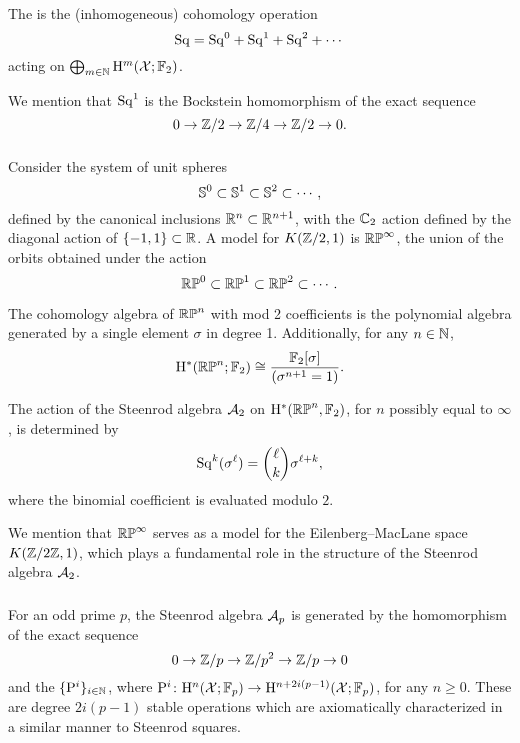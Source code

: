 The  is the (inhomogeneous) cohomology operation
\[
\mathrm{Sq} = \mathrm{Sq}^0 + \mathrm{Sq}^1 + \mathrm{Sq}^2 + \dotsb
\]
acting on \(\bigoplus_{m \in \mathbb{N}} \mathrm{H}^m(\mathcal{X}; {\mathbb{F}_2})\).

We mention that $\mathrm{Sq}^1$ is the Bockstein homomorphism of the exact sequence
\[
0 \to \mathbb{Z}/2 \to \mathbb{Z}/4 \to \mathbb{Z}/2 \to 0.
\]

\subsubsection{}\label{sss:cohomology_rpn}

Consider the system of unit spheres
\[
\mathbb{S}^0 \subset \mathbb{S}^1 \subset \mathbb{S}^2 \subset \dotsb,
\]
defined by the canonical inclusions \(\mathbb{R}^n \subset \mathbb{R}^{n+1}\), with the \(\mathbb{C}_2\) action defined by the diagonal action of \(\{-1,1\} \subset \mathbb{R}\).
A model for \(K(\mathbb{Z}/2, 1)\) is \(\mathbb{RP}^\infty\), the union of the orbits obtained under the action
\[
\mathbb{RP}^0 \subset \mathbb{RP}^1 \subset \mathbb{RP}^2 \subset \dotsb.
\]

The cohomology algebra of $\mathbb{RP}^n$ with mod 2 coefficients is the polynomial algebra generated by a single element $\sigma$ in degree 1.
Additionally, for any $n \in \mathbb{N}$,
\[
\mathrm{H}^\ast(\mathbb{RP}^n; {\mathbb{F}_2}) \cong \frac{{\mathbb{F}_2}[\sigma]}{(\sigma^{n+1} = 1)}.
\]

The action of the Steenrod algebra $\mathcal{A}_2$ on $\mathrm{H}^*(\mathbb{RP}^n, {\mathbb{F}_2})$, for $n$ possibly equal to $\infty$, is determined by
\[
\mathrm{Sq}^k(\sigma^\ell) = \binom{\ell}{k}\sigma^{\ell+k},
\]
where the binomial coefficient is evaluated modulo \(2\).

We mention that $\mathbb{RP}^\infty$ serves as a model for the Eilenberg--MacLane space $K(\mathbb{Z}/2\mathbb{Z}, 1)$, which plays a fundamental role in the structure of the Steenrod algebra \(\mathcal{A}_2\).

\subsubsection{}\label{sss:steenrod_odd}

For an odd prime \(p\), the Steenrod algebra $\mathcal{A}_p$ is generated by the  homomorphism of the exact sequence
\[
0 \to \mathbb{Z}/p \to \mathbb{Z}/p^2 \to \mathbb{Z}/p \to 0
\]
and the  \(\{\mathrm{P}^i\}_{i \in \mathbb{N}}\), where $\mathrm{P}^i \colon \mathrm{H}^n(\mathcal{X}; {\mathbb{F}_p}) \to \mathrm{H}^{n+2i(p-1)}(\mathcal{X}; {\mathbb{F}_p})$, for any $n\geq 0$.
These are degree \(2i(p-1)\) stable operations which are axiomatically characterized in a similar manner to Steenrod squares.


